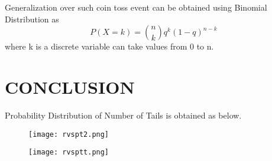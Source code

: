 \documentclass[journal,12pt,twocolumn]{IEEEtran}
\begin{document}
Generalization over such coin toss event  can be obtained using Binomial Distribution as
\begin{equation}
    P(X=k)= \binom{n}{k} q^k (1-q)^{n-k}
\end{equation}
where k is a discrete variable can take values from 0 to n.
\section{CONCLUSION}

Probability Distribution of Number of Tails is obtained as below.
\newpage
\begin{figure}[ht]
    \texttt{[image: rvspt2.png]}
 \end{figure} 
\begin{figure}[ht]
    \texttt{[image: rvsptt.png]}
    
\end{figure}
\end{document}
